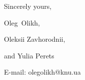 \documentclass[preprint]{elsarticle}
\begin{document}
\vspace{3mm}

Sincerely yours,

Oleg~Olikh, 

Oleksii Zavhorodnii, 

and Yulia Perets


E-mail: olegolikh@knu.ua


\end{document}
